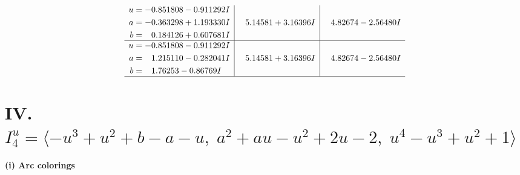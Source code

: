 \documentclass[1p]{elsarticle_modified}
\theoremstyle{definition}
\begin{document}
$$\begin{array}{c|c|c}
\begin{aligned}
u &= -0.851808 - 0.911292 I \\
a &= -0.363298 + 1.193330 I \\
b &= \phantom{-}0.184126 + 0.607681 I\end{aligned}
 & \phantom{-}5.14581 + 3.16396 I & \phantom{-}4.82674 - 2.56480 I \\ \hline\begin{aligned}
u &= -0.851808 - 0.911292 I \\
a &= \phantom{-}1.215110 - 0.282041 I \\
b &= \phantom{-}1.76253 - 0.86769 I\end{aligned}
 & \phantom{-}5.14581 + 3.16396 I & \phantom{-}4.82674 - 2.56480 I\\
 \hline 
 \end{array}$$\newpage\newpage\renewcommand{\arraystretch}{1}
\centering \section*{IV. $I^u_{4}= \langle - u^3+u^2+b- a- u,\;a^2+a u- u^2+2 u-2,\;u^4- u^3+u^2+1 \rangle$}
\flushleft \textbf{(i) Arc colorings}\\
\end{document}
